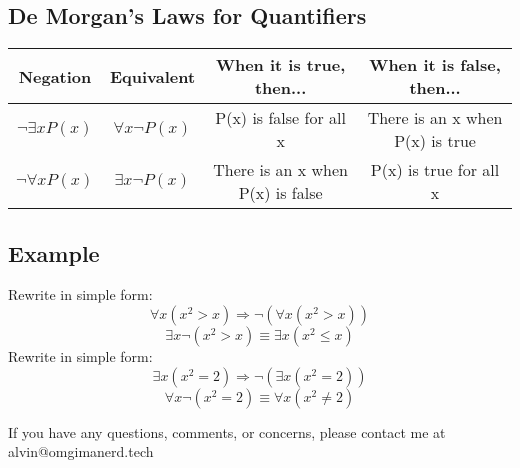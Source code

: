 \documentclass[letterpaper, 12pt]{math}
\begin{document}
\subsection*{De Morgan's Laws for Quantifiers}
\begin{center}
  \begin{tabular}{|c|c|c|c|}
    \hline
    Negation & Equivalent & When it is true, then... &
    When it is false, then... \\ \hline
    \( \neg{\exists{x}P(x)} \) & \( \forall{x}\neg{P(x)} \) &
    P(x) is false for all x & There is an x when P(x) is true \\ \hline
    \( \neg{\forall{x}P(x)} \) & \( \exists{x}\neg{P(x)} \) &
    There is an x when P(x) is false & P(x) is true for all x \\ \hline
  \end{tabular}
\end{center}

\subsection*{Example}
Rewrite in simple form:
\[ \forall{x}(x^{2} > x) \Rightarrow \neg{(\forall{x}(x^{2}>x))} \]
\[ \exists{x}\neg{(x^{2} > x)} \equiv \exists{x}(x^{2} \leq x) \]
Rewrite in simple form:
\[ \exists{x}(x^{2} = 2) \Rightarrow \neg{(\exists{x}(x^{2} = 2))} \]
\[ \forall{x}\neg{(x^{2} = 2)} \equiv \forall{x}(x^{2} \neq 2) \]

\begin{center}
  If you have any questions, comments, or concerns, please contact me at
  alvin@omgimanerd.tech
\end{center}
\end{document}
